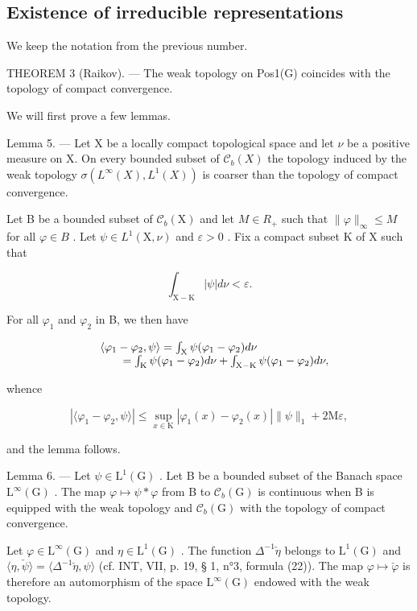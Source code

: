 \subsection{Existence of irreducible representations}

We keep the notation from the previous number.

THEOREM 3 (Raikov). --- The weak topology on Pos1(G) coincides with the topology of compact convergence.

We will first prove a few lemmas.

Lemma 5. --- Let X be a locally compact topological space and let \(\nu\) be a positive measure on X. On every bounded subset of \(\mathcal{C}_{b}(X)\) the topology induced by the weak topology \(\sigma(L^{\infty}(X), L^{1}(X))\) is coarser than the topology of compact convergence.

Let B be a bounded subset of \(\mathcal{C}_{b}(\mathrm{X})\) and let \(M \in R_{+}\) such that \(\|\varphi\|_{\infty} \leqslant M\) for all \(\varphi \in B\) . Let \(\psi \in L^{1}(\mathrm{X}, \nu)\) and \(\varepsilon > 0\) . Fix a compact subset K of X such that

\[
\int_ {\mathrm{X-K}} | \psi | d \nu <   \varepsilon .
\]

For all \(\varphi_{1}\) and \(\varphi_{2}\) in B, we then have

\[
\begin{array}{r l} & {\langle \varphi_ {1} - \varphi_ {2}, \psi \rangle = \int_ {\mathrm{X}} \psi (\varphi_ {1} - \varphi_ {2}) d \nu} \\ & {\qquad = \int_ {\mathrm{K}} \psi (\varphi_ {1} - \varphi_ {2}) d \nu + \int_ {\mathrm{X-K}} \psi (\varphi_ {1} - \varphi_ {2}) d \nu ,} \end{array}
\]

whence

\[
| \langle \varphi_ {1} - \varphi_ {2}, \psi \rangle | \leqslant \sup _ {x \in \mathrm{K}} | \varphi_ {1} (x) - \varphi_ {2} (x) | \| \psi \| _ {1} + 2 \mathrm{M} \varepsilon ,
\]

and the lemma follows.

Lemma 6. --- Let \(\psi \in \mathrm{L}^{1}(\mathrm{G})\) . Let B be a bounded subset of the Banach space \(\mathrm{L}^{\infty}(\mathrm{G})\) . The map \(\varphi \mapsto \psi * \varphi\) from B to \(\mathcal{C}_b(\mathrm{G})\) is continuous when B is equipped with the weak topology and \(\mathcal{C}_b(\mathrm{G})\) with the topology of compact convergence.

Let \(\varphi\in\mathrm{L}^{\infty}(\mathrm{G})\) and \(\eta\in\mathrm{L}^{1}(\mathrm{G})\) . The function \(\Delta^{-1}\check{\eta}\) belongs to \(\mathrm{L}^{1}(\mathrm{G})\) and \(\langle\eta,\check{\psi}\rangle=\langle\Delta^{-1}\check{\eta},\psi\rangle\) (cf. INT, VII, p. 19, § 1, n°3, formula (22)). The map \(\varphi\mapsto\check{\varphi}\) is therefore an automorphism of the space \(\mathrm{L}^{\infty}(\mathrm{G})\) endowed with the weak topology.

